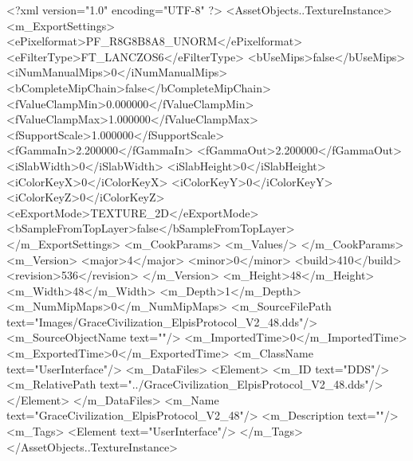 <?xml version="1.0" encoding="UTF-8" ?>
<AssetObjects..TextureInstance>
	<m_ExportSettings>
		<ePixelformat>PF_R8G8B8A8_UNORM</ePixelformat>
		<eFilterType>FT_LANCZOS6</eFilterType>
		<bUseMips>false</bUseMips>
		<iNumManualMips>0</iNumManualMips>
		<bCompleteMipChain>false</bCompleteMipChain>
		<fValueClampMin>0.000000</fValueClampMin>
		<fValueClampMax>1.000000</fValueClampMax>
		<fSupportScale>1.000000</fSupportScale>
		<fGammaIn>2.200000</fGammaIn>
		<fGammaOut>2.200000</fGammaOut>
		<iSlabWidth>0</iSlabWidth>
		<iSlabHeight>0</iSlabHeight>
		<iColorKeyX>0</iColorKeyX>
		<iColorKeyY>0</iColorKeyY>
		<iColorKeyZ>0</iColorKeyZ>
		<eExportMode>TEXTURE_2D</eExportMode>
		<bSampleFromTopLayer>false</bSampleFromTopLayer>
	</m_ExportSettings>
	<m_CookParams>
		<m_Values/>
	</m_CookParams>
	<m_Version>
		<major>4</major>
		<minor>0</minor>
		<build>410</build>
		<revision>536</revision>
	</m_Version>
	<m_Height>48</m_Height>
	<m_Width>48</m_Width>
	<m_Depth>1</m_Depth>
	<m_NumMipMaps>0</m_NumMipMaps>
	<m_SourceFilePath text="Images/GraceCivilization_ElpisProtocol_V2_48.dds"/>
	<m_SourceObjectName text=""/>
	<m_ImportedTime>0</m_ImportedTime>
	<m_ExportedTime>0</m_ExportedTime>
	<m_ClassName text="UserInterface"/>
	<m_DataFiles>
		<Element>
			<m_ID text="DDS"/>
			<m_RelativePath text="../GraceCivilization_ElpisProtocol_V2_48.dds"/>
		</Element>
	</m_DataFiles>
	<m_Name text="GraceCivilization_ElpisProtocol_V2_48"/>
	<m_Description text=""/>
	<m_Tags>
		<Element text="UserInterface"/>
	</m_Tags>
</AssetObjects..TextureInstance>
